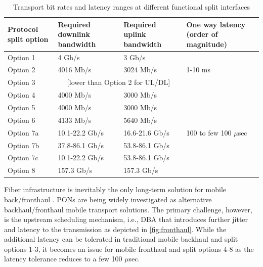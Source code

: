 \begin{table}[t]
\centering
    \caption{Transport bit rates and latency ranges at different functional split interfaces \cite{ituG.front}}
	\begin{tabular}{|p{}|p{}|p{}|p{}|}
		\hline
		 Protocol split option & Required downlink bandwidth & Required uplink bandwidth & One way latency (order of magnitude)\\\hline
		 
		 Option 1 & 4 Gb/s & 3 Gb/s & \\\cline{1-3}
		 Option 2 & 4016 Mb/s & 3024 Mb/s & 1-10 ms \\ \cline{1-3}
		 Option 3 &  \multicolumn{2}{|c|}{[lower than Option 2 for UL/DL]}  &  \\ \hline
		 Option 4 & 4000 Mb/s & 3000 Mb/s & \multirow{7}{0.7in}{100 to few 100 $\mu$sec}\\\cline{1-3}
		 Option 5 & 4000 Mb/s & 3000 Mb/s &  \\ \cline{1-3}
		 Option 6 & 4133 Mb/s & 5640 Mb/s &  \\ \cline{1-3}
		 Option 7a & 10.1-22.2 Gb/s & 16.6-21.6 Gb/s &  \\ \cline{1-3}
		 Option 7b & 37.8-86.1 Gb/s & 53.8-86.1 Gb/s &  \\ \cline{1-3}
		 Option 7c & 10.1-22.2 Gb/s & 53.8-86.1 Gb/s &  \\ \cline{1-3}
		 Option 8 & 157.3 Gb/s & 157.3 Gb/s &  \\ \hline
	\end{tabular}

	\label{Tab:xhaul}
\end{table}

Fiber infrastructure is inevitably the only long-term solution for mobile back/fronthaul \cite{6461186}. \acp{PON} are being widely investigated as alternative backhaul/fronthaul mobile transport solutions. The primary challenge, however, is the upstream scheduling mechanism, i.e., \ac{DBA} that introduces further jitter and latency to the transmission as depicted in \autoref{fig:fronthaul}. While the additional latency can be tolerated in traditional mobile backhaul and split options 1-3, it becomes an issue for mobile fronthaul and split options 4-8 as the latency tolerance reduces to a few 100 $\mu$sec.





